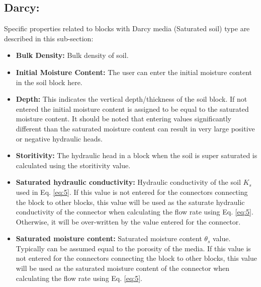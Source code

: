 \subsection{Darcy: }
Specific properties related to blocks with Darcy media (Saturated soil) type are described in this sub-section: 
\begin{itemize}
\item \textbf{Bulk Density: } Bulk density of soil. 
\item \textbf{Initial Moisture Content: } The user can enter the initial moisture content in the soil block here. 
\item \textbf{Depth: } This indicates the vertical depth/thickness of the soil block. If not entered the initial moisture content is assigned to be equal to the saturated moisture content. It should be noted that entering values significantly different than the saturated moisture content can result in very large positive or negative hydraulic heads. 
\item \textbf{Storitivity: } The hydraulic head in a block when the soil is super saturated is calculated using the storitivity value. 
\item \textbf{Saturated hydraulic conductivity: } Hydraulic conductivity of the soil $K_s$ used in Eq. \ref{eq:5}. If this value is not entered for the connectors connecting the block to other blocks, this value will be used as the saturate hydraulic conductivity of the connector when calculating the flow rate using Eq. \ref{eq:5}. Otherwise, it will be over-written by the value entered for the connector. 
\item \textbf{Saturated moisture content: } Saturated moisture content $\theta_s$ value. Typically can be assumed equal to the porosity of the media. If this value is not entered for the connectors connecting the block to other blocks, this value will be used as the saturated moisture content of the connector when calculating the flow rate using Eq. \ref{eq:5}. 
\end{itemize}
